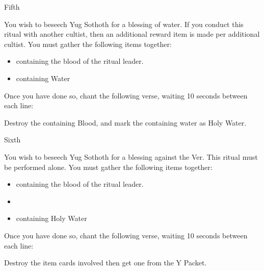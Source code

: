 \documentclass[greennotebook]{guildcamp4} %
\begin{document}
\begin{page}{Fifth}
	
		You wish to beseech Yug Sothoth for a blessing of water. If you conduct this ritual with another cultist, then an additional reward item is made per additional cultist. You must gather the following items together: 
		
		\begin{itemize}
			\item \iTestTube{} containing the blood of the ritual leader.
			\item \iTestTube{} containing Water
		\end{itemize}
		
		Once you have done so, chant the following verse, waiting 10 seconds between each line:
		
		
		Destroy the \iTestTube{} containing Blood, and mark the \iTestTube{} containing water as Holy Water.
		
	
\end{page}

\begin{page}{Sixth}
	

	You wish to beseech Yug Sothoth for a blessing against the Ver. This ritual must be performed alone. You must gather the following items together:
		
	\begin{itemize}
			\item \iTestTube{} containing the blood of the ritual leader.
			\item \iGlassLens{}
			\item \iTestTube{} containing Holy Water
	\end{itemize}
	
	Once you have done so, chant the following verse, waiting 10 seconds between each line:
		
	
	Destroy the item cards involved then get one \aHolyHands{} from the Y Packet.
	
	
\end{page}


\endnotebook
\end{document}
